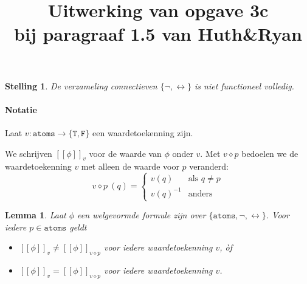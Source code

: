 \documentclass[a4paper,11pt]{article}
\title{Uitwerking van opgave 3c\\
\normalsize{bij paragraaf 1.5 van Huth\&Ryan}}
\date{}
\newtheorem{lemma}{Lemma}
\newtheorem*{theorem}{Stelling}
\begin{document}
\maketitle


\begin{theorem}\label{thm:incomplete}
  De verzameling connectieven $\{\neg, \leftrightarrow\}$ is niet functioneel
    volledig.
\end{theorem}

\paragraph{Notatie}

Laat $v : \mathtt{atoms} \rightarrow \{\mathtt{T}, \mathtt{F}\}$ een
waardetoekenning zijn.

We schrijven $[\![ \phi ]\!]_{v}$ voor de waarde van $\phi$ onder $v$.
Met $v \diamond p$ bedoelen we de waardetoekenning $v$ met alleen de waarde voor $p$
veranderd:
\begin{equation*}
  v \diamond p \: (q) =
  \begin{cases}
    v(q)     & \mbox{als }q \neq p \\
    v(q)^{-1} & \mbox{anders}
  \end{cases}
\end{equation*}

\renewcommand{\labelitemi}{}
\begin{lemma}\label{lem:linear}
  Laat $\phi$ een welgevormde formule zijn over $\{\mathtt{atoms}, \neg, \leftrightarrow\}$.
  Voor iedere $p \in \mathtt{atoms}$ geldt
  \begin{itemize}
    \item $[\![ \phi ]\!]_{v} \neq [\![ \phi ]\!]_{v \diamond p}$ voor iedere waardetoekenning $v$, \`of
    \item $[\![ \phi ]\!]_{v} = [\![ \phi ]\!]_{v \diamond p}$ voor iedere waardetoekenning $v$.
  \end{itemize}
\end{lemma}
\end{document}
